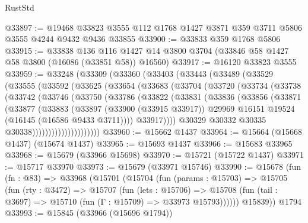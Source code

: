 \begin{lexlean}{RustStd}
\begin{coremodule}
@33897 := @19468 @33823 @3555 @112 @1768 @1427 @3871 @359 @3711 @5806 @3555 @4244 @9432 @9436 @33855
@33900 := @33833 @359 @1768 @5806
@33915 := @33838
    @136
    @116
    @1427
    @14
    @3800
    @3704
    (@33846 @58 @1427 @58 @3800 (@16086 (@33851 @58)) @16560)
@33917 := @16120 @33823 @3555
@33959 := @33248
    (@33309
      (@33360
        (@33403
          (@33443
            (@33489
              (@33529
                (@33555
                  (@33592
                    (@33625
                      (@33654
                        (@33683
                          (@33704
                            (@33720
                              (@33734
                                (@33738
                                  (@33742
                                    (@33746
                                      (@33750
                                        (@33786
                                          (@33822
                                            (@33831
                                              (@33836
                                                (@33856
                                                  (@33871
                                                    (@33877
                                                      (@33883
                                                        (@33897
                                                          (@33900 (@33915 @33917))
                                                          @29969
                                                          @16151
                                                          @19524
                                                          (@16145 (@16586 @9433 @3711))))
                                                      @33917))))
                                              @30329
                                              @30332
                                              @30335
                                              @30338)))))))))))))))))))))
@33960 := @15662 @1437
@33964 := @15664 (@15668 @1437) (@15674 @1437)
@33965 := @15693 @1437
@33966 := @15683 @33965
@33968 := @15679 (@33966 @15698)
@33970 := @15721 (@15722 @1437)
@33971 := @15717 @33970
@33973 := @15679 (@33971 @15746)
@33990 := @15678
    (fun (fn : @83) =>
    @33968
      (@15701
        (@15704
          (fun (params : @15703) =>
          @15705
            (fun (rty : @3472) =>
            @15707
              (fun (lets : @15706) =>
              @15708 (fun (tail : @3697) => @15710 (fun (Γ : @15709) => @33973 @15793))))))
        @15839))
    @1794
@33993 := @15845 (@33966 (@15696 @1794))

\end{coremodule}
\end{lexlean}
